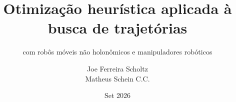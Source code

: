 \documentclass[aspectratio=169]{beamer}
\title{Otimização heurística aplicada à busca de trajetórias}
\subtitle{com robôs móveis não holonômicos e manipuladores robóticos}
\institute{UFRGS - Universidade Federal do Rio Grande do Sul}
\author{Joe Ferreira Scholtz\\Matheus Schein C.C.}
\date{Set 2026}
\begin{document}
\begin{frame}
    \maketitle
\end{frame}

\InsertTocFrame








\end{document}
